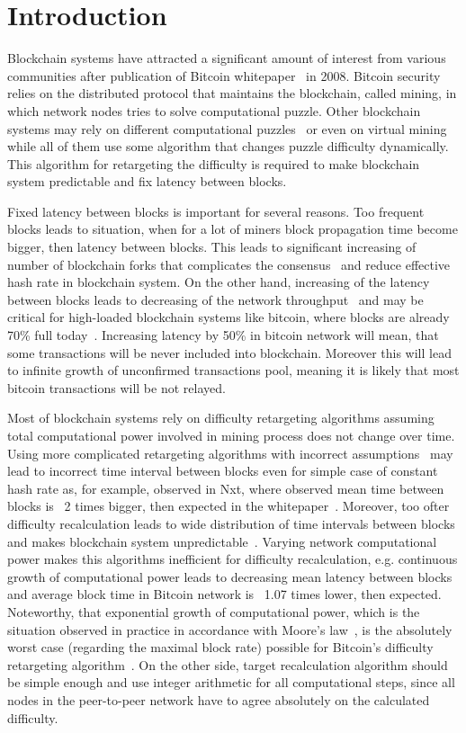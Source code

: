 \documentclass[number,preprint,review]{elsarticle}
\begin{document}
\section{Introduction}
\label{sec:intro}

Blockchain systems have attracted a significant amount of interest from various communities after publication of Bitcoin whitepaper~\cite{Nakamoto2008} in 2008.
Bitcoin security relies on the distributed protocol that maintains the blockchain, called mining, in which network nodes tries to solve computational puzzle.
Other blockchain systems may rely on different computational puzzles~\cite{??} or even on virtual mining~\cite{??} while all of them use some algorithm that changes puzzle difficulty dynamically.
This algorithm for retargeting the difficulty is required to make blockchain system predictable and fix latency between blocks.

Fixed latency between blocks is important for several reasons.
Too frequent blocks leads to situation, when for a lot of miners block propagation time become bigger, then latency between blocks.
This leads to significant increasing of number of blockchain forks that complicates the consensus~\cite{decker2013information} and reduce effective hash rate in blockchain system.
On the other hand, increasing of the latency between blocks leads to decreasing of the network throughput~\cite{miller2016} and may be critical for high-loaded blockchain systems like bitcoin, where blocks are already 70\% full today~\cite{armstrong2016}.
Increasing latency by 50\% in bitcoin network will mean, that some transactions will be never included into blockchain.
Moreover this will lead to infinite growth of unconfirmed transactions pool, meaning it is likely that most bitcoin transactions will be not relayed.

Most of blockchain systems rely on difficulty retargeting algorithms assuming total computational power involved in mining process does not change over time.
Using more complicated retargeting algorithms with incorrect assumptions~\cite{andruiman2014} may lead to incorrect time interval between blocks even for simple case of constant hash rate as, for example, observed in Nxt, where observed mean time between blocks is ~2 times bigger, then expected in the whitepaper~\cite{nxt}. Moreover, too ofter difficulty recalculation leads to wide distribution of time intervals between blocks and makes blockchain system unpredictable~\cite{andruiman2014}.
Varying network computational power makes this algorithms inefficient for difficulty recalculation, e.g. continuous growth of computational power leads to decreasing mean latency between blocks and average block time in Bitcoin network is ~1.07 times lower, then expected.
Noteworthy, that exponential growth of computational power, which is the situation observed in practice in accordance with Moore’s law~\cite{moore2006cramming}, is the absolutely worst case (regarding the maximal block rate) possible for Bitcoin’s difficulty retargeting algorithm~\cite{kraft2015difficulty}.
On the other side, target recalculation algorithm should be simple enough and use integer arithmetic for all computational steps, since all nodes in the peer-to-peer network have to agree absolutely on the calculated difficulty.
\end{document}
